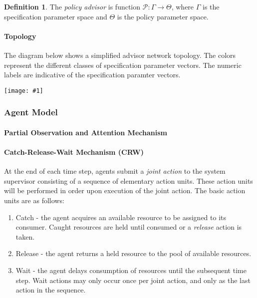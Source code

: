 \documentclass{article}
\theoremstyle{definition}
\newtheorem{definition}{Definition}[section]
\theoremstyle{remark}
\newcommand{\addpic}[1]{\texttt{[image: \#1]}}
\begin{document}
			\begin{definition}
				The \emph{policy advisor} is function $\mathcal{P}: \Gamma \rightarrow \Theta$, where $\Gamma$ is the specification parameter space and $\Theta$ is the policy parameter space.
			\end{definition}
				

				\paragraph{Topology}
				
				The diagram below shows a simplified advisor network topology. The colors represent the different classes of specification parameter vectors. The numeric labels are indicative of the specification paramter vectors.
				
				\addpic{figures/advisor_topology.jpeg}

		\subsubsection{Agent Model}
		
			\paragraph{Partial Observation and Attention Mechanism}
	
			\paragraph{Catch-Release-Wait Mechanism (CRW)}
	
			At the end of each time step, agents submit a \emph{joint action} to the system supervisor consisting of a sequence of elementary action units. These action units will be performed in order upon execution of the joint action. The basic action units are as follows:
	
			\begin{enumerate}
				\item Catch - the agent acquires an available resource to be assigned to its consumer. Caught resources are held until consumed or a \emph{release} action is taken.
				\item Release - the agent returns a held resource to the pool of available resources.
				\item Wait - the agent delays consumption of resources until the subsequent time step. Wait actions may only occur once per joint action, and only as the last action in the sequence.
			\end{enumerate}
		
\end{document}
